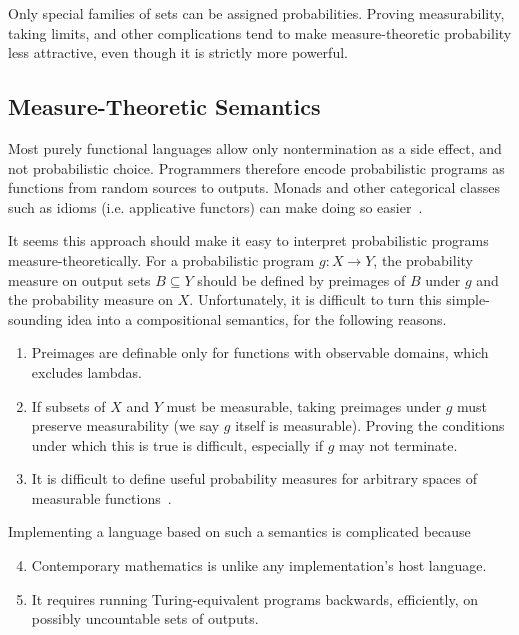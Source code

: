 Only special families of  sets can be assigned probabilities.
Proving measurability, taking limits, and other complications tend to make measure-theoretic probability less attractive, even though it is strictly more powerful.

\subsection{Measure-Theoretic Semantics}

Most purely functional languages allow only nontermination as a side effect, and not probabilistic choice.
Programmers therefore encode probabilistic programs as functions from random sources to outputs.
Monads and other categorical classes such as idioms (i.e. applicative functors) can make doing so easier~\cite{cit:hurd-2002thesis,cit:toronto-2010ifl-bayes}.

It seems this approach should make it easy to interpret probabilistic programs measure-theoretically.
For a probabilistic program $g : X \to Y$, the probability measure on output sets $B \subseteq Y$ should be defined by preimages of $B$ under $g$ and the probability measure on $X$.
Unfortunately, it is difficult to turn this simple-sounding idea into a compositional semantics, for the following reasons.
\begin{enumerate}
	\item Preimages are definable only for functions with observable domains, which excludes lambdas.%
\label{problem:observable-domain}
	\item If subsets of $X$ and $Y$ must be measurable, taking preimages under $g$ must preserve measurability (we say $g$ itself is measurable). Proving the conditions under which this is true is difficult, especially if $g$ may not terminate.%
\label{problem:measurability}
	\item It is difficult to define useful probability measures for arbitrary spaces of measurable functions~\cite{cit:aumann-1961ijm-borel}.%
\label{problem:higher-orderness}
\end{enumerate}
Implementing a language based on such a semantics is complicated because
\begin{enumerate}
	\setcounter{enumi}{3}
	\item Contemporary mathematics is unlike any implementation's host language.%
\label{problem:different-language}
	\item It requires running Turing-equivalent programs backwards, efficiently, on possibly uncountable sets of outputs.%
\label{problem:backward-efficient}
\end{enumerate}

